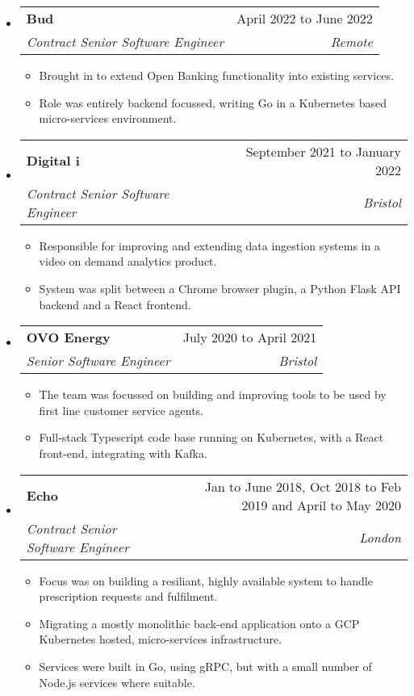 \documentclass[letterpaper,12pt]{article}[leftmargin=*]
\makeatletter
\def \entryspacing {-0pt}
\newenvironment{resumeEntry}[0]{
  \begin{itemize}[leftmargin=2.5mm]
  }{
  \end{itemize}\vspace{\entryspacing}
}
\newenvironment{resumeItemList}[0]{
  \begin{itemize}[leftmargin=4.5mm]
  }{
  \end{itemize}
}
\newcommand{\resumeItem}[1]{
  \item\small{
    {#1 \vspace{-2pt}}
  }
}
\newcommand{\resumeEntryTSDL}[4]{
  \vspace{-1pt}\item[]
    \begin{tabularx}{0.97\textwidth}{X@{\hspace{60pt}}r}
      \textbf{\color{primary}#1} & {\firabook\color{accent}\small#2} \\
      \textit{\color{accent}\small#3} & \textit{\color{accent}\small#4} \\
    \end{tabularx}\vspace{-6pt}
}
\makeatother
\begin{document}
  \begin{resumeEntry}
    \resumeEntryTSDL{Bud}{April 2022 to June 2022}
      {Contract Senior Software Engineer}{Remote}
    \begin{resumeItemList}
      \resumeItem{Brought in to extend Open Banking functionality into existing services.}
      \resumeItem{Role was entirely backend focussed, writing Go in a Kubernetes based micro-services environment.}
    \end{resumeItemList}
  \end{resumeEntry}

  \begin{resumeEntry}
    \resumeEntryTSDL{Digital i}{September 2021 to January 2022}
      {Contract Senior Software Engineer}{Bristol}
    \begin{resumeItemList}
      \resumeItem{Responsible for improving and extending data ingestion systems in a video on demand analytics product.}
      \resumeItem{System was split between a Chrome browser plugin, a Python Flask API backend and a React frontend.}
    \end{resumeItemList}
  \end{resumeEntry}

  \begin{resumeEntry}
    \resumeEntryTSDL{OVO Energy}{July 2020 to April 2021}
      {Senior Software Engineer}{Bristol}
    \begin{resumeItemList}
      \resumeItem{The team was focussed on building and improving tools to be used by first line customer service agents.}
      \resumeItem{Full-stack Typescript code base running on Kubernetes, with a React front-end, integrating with Kafka.}
    \end{resumeItemList}
  \end{resumeEntry}

  \begin{resumeEntry}
    \resumeEntryTSDL{Echo}{Jan to June 2018, Oct 2018 to Feb 2019 and April to May 2020}
      {Contract Senior Software Engineer}{London}
    \begin{resumeItemList}
      \resumeItem{Focus was on building a resiliant, highly available system to handle prescription requests and fulfilment.}
      \resumeItem{Migrating a mostly monolithic back-end application onto a GCP Kubernetes hosted, micro-services infrastructure.}
      \resumeItem{Services were built in Go, using gRPC, but with a small number of Node.js services where suitable.}
    \end{resumeItemList}
  \end{resumeEntry}
\end{document}
